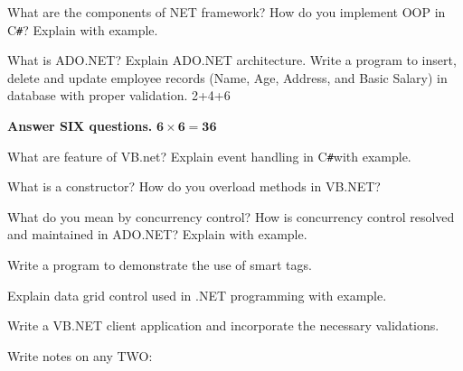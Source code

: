 \documentclass[a4paper, twoside, 12pt, noanswers]{exam}
\newcommand{\cs}{C\texttt{\#}}
\begin{document}
\begin{questions}

	\question What are the components of NET framework? How do you implement
	OOP in \cs? Explain with example.

	\question What is ADO.NET? Explain ADO.NET architecture. Write a
	program to insert, delete and update employee records (Name,
	Age, Address, and Basic Salary) in database with proper
	validation. 2+4+6

	\question


	{\par}
	{\hspace*{-0.5cm}\noindent\bfseries Answer SIX questions.} \hfill {\( \mathbf{6 \times 6 = 36}\)}

	\question What are feature of VB.net? Explain event handling in \cs with
	example.

	\question What is a constructor? How do you overload methods in
	VB.NET?

	\question What do you mean by concurrency control? How is concurrency
	control resolved and maintained in ADO.NET? Explain with
	example.

	\question Write a program to demonstrate the use of smart tags.

	\question Explain data grid control used in .NET programming with
	example.

	\question Write a VB.NET client application and incorporate the necessary
	validations.

	\question Write notes on any TWO:

\end{questions}
\newpage
\end{document}
